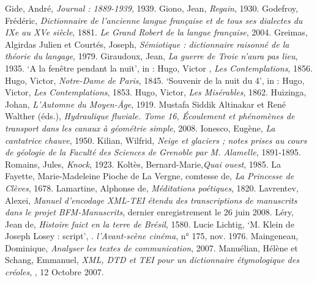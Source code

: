 \begin{bibitemlist}{1}
 Gide, André, \textit{Journal : 1889-1939}, 1939.
 Giono, Jean, \textit{Regain}, 1930.
 Godefroy, Frédéric, \textit{Dictionnaire de l'ancienne langue française et de tous ses dialectes du IXe au XVe siècle}, 1881.
 \textit{Le Grand Robert de la langue française}, 2004.
 Greimas, Algirdas Julien et Courtés, Joseph, \textit{Sémiotique : dictionnaire raisonné de la théorie du langage}, 1979.
 Giraudoux, Jean, \textit{La guerre de Troie n'aura pas lieu}, 1935.
 ‘A la fenêtre pendant la nuit’, in : Hugo, Victor , \textit{Les Contemplations}, 1856.
 Hugo, Victor, \textit{Notre-Dame de Paris}, 1845.
 ‘Souvenir de la nuit du 4’, in : Hugo, Victor, \textit{Les Contemplations}, 1853.
 Hugo, Victor, \textit{Les Misérables}, 1862.
 Huizinga, Johan, \textit{L'Automne du Moyen-Âge}, 1919.
 Mustafa Siddik Altinakar et René Walther (éds.), \textit{Hydraulique fluviale. Tome 16, Écoulement et phénomènes de transport dans les canaux à géométrie simple}, 2008.
 Ionesco, Eugène, \textit{La cantatrice chauve}, 1950.
 Kilian, Wilfrid, \textit{Neige et glaciers ; notes prises au cours de géologie de la Faculté des Sciences de Grenoble par M. Alamelle}, 1891-1895.
 Romains, Jules, \textit{Knock}, 1923.
 Koltès, Bernard-Marie,\textit{Quai ouest}, 1985.
 La Fayette, Marie-Madeleine Pioche de La Vergne, comtesse de, \textit{La Princesse de Clèves}, 1678.
 Lamartine, Alphonse de, \textit{Méditations poétiques}, 1820.
 Lavrentev, Alexei, \textit{Manuel d’encodage XML-TEI étendu des transcriptions de manuscrits dans le projet BFM-Manuscrits}, dernier enregistrement le 26 juin 2008.
 Léry, Jean de, \textit{Histoire faict en la terre de Brésil}, 1580.
 Lucie Lichtig, ‘M. Klein de Joseph Losey : script’, . \textit{l'Avant-scène cinéma}, n° 175, nov. 1976.
 Maingeneau, Dominique, \textit{Analyser les textes de communication}, 2007.
 Manuélian, Hélène et Schang, Emmanuel, \textit{XML, DTD et TEI pour un dictionnaire étymologique des créoles}, , 12 Octobre 2007.

\end{bibitemlist}
